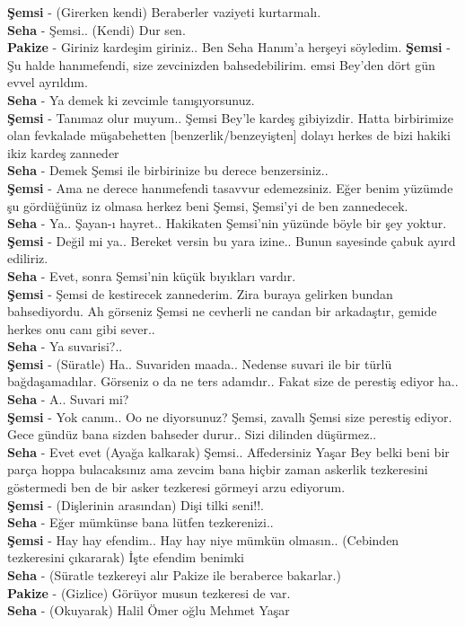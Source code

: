 \documentclass[]{book}
\begin{document}
\textbf{Şemsi} - (Girerken kendi) Beraberler vaziyeti kurtarmalı.\\
\textbf{Seha} - Şemsi.. (Kendi) Dur sen.\\
\textbf{Pakize} - Giriniz kardeşim giriniz.. Ben Seha Hanım'a herşeyi söyledim.
\textbf{Şemsi} - Şu halde hanımefendi, size zevcinizden bahsedebilirim. emsi Bey'den dört gün evvel ayrıldım.\\
\textbf{Seha} - Ya demek ki zevcimle tanışıyorsunuz.\\
\textbf{Şemsi} - Tanımaz olur muyum.. Şemsi Bey'le kardeş gibiyizdir. Hatta birbirimize olan fevkalade müşabehetten {[}benzerlik/benzeyişten{]} dolayı herkes de bizi hakiki ikiz kardeş zanneder\\
\textbf{Seha} - Demek Şemsi ile birbirinize bu derece benzersiniz..\\
\textbf{Şemsi} - Ama ne derece hanımefendi tasavvur edemezsiniz. Eğer benim yüzümde şu gördüğünüz iz olmasa herkez beni Şemsi, Şemsi'yi de ben zannedecek.\\
\textbf{Seha} - Ya.. Şayan-ı hayret.. Hakikaten Şemsi'nin yüzünde böyle bir şey yoktur.\\
\textbf{Şemsi} - Değil mi ya.. Bereket versin bu yara izine.. Bunun sayesinde çabuk ayırd ediliriz.\\
\textbf{Seha} - Evet, sonra Şemsi'nin küçük bıyıkları vardır.\\
\textbf{Şemsi} - Şemsi de kestirecek zannederim. Zira buraya gelirken bundan bahsediyordu. Ah görseniz Şemsi ne cevherli ne candan bir arkadaştır, gemide herkes onu canı gibi sever..\\
\textbf{Seha} - Ya suvarisi?..\\
\textbf{Şemsi} - (Süratle) Ha.. Suvariden maada.. Nedense suvari ile bir türlü bağdaşamadılar. Görseniz o da ne ters adamdır.. Fakat size de perestiş ediyor ha..\\
\textbf{Seha} - A.. Suvari mi?\\
\textbf{Şemsi} - Yok canım.. Oo ne diyorsunuz? Şemsi, zavallı Şemsi size perestiş ediyor. Gece gündüz bana sizden bahseder durur.. Sizi dilinden düşürmez..\\
\textbf{Seha} - Evet evet (Ayağa kalkarak) Şemsi.. Affedersiniz Yaşar Bey belki beni bir parça hoppa bulacaksınız ama zevcim bana hiçbir zaman askerlik tezkeresini göstermedi ben de bir asker tezkeresi görmeyi arzu ediyorum.\\
\textbf{Şemsi} - (Dişlerinin arasından) Dişi tilki seni!!.\\
\textbf{Seha} - Eğer mümkünse bana lütfen tezkerenizi..\\
\textbf{Şemsi} - Hay hay efendim.. Hay hay niye mümkün olmasın.. (Cebinden tezkeresini çıkararak) İşte efendim benimki\\
\textbf{Seha} - (Süratle tezkereyi alır Pakize ile beraberce bakarlar.)\\
\textbf{Pakize} - (Gizlice) Görüyor musun tezkeresi de var.\\
\textbf{Seha} - (Okuyarak) Halil Ömer oğlu Mehmet Yaşar\\
\end{document}
